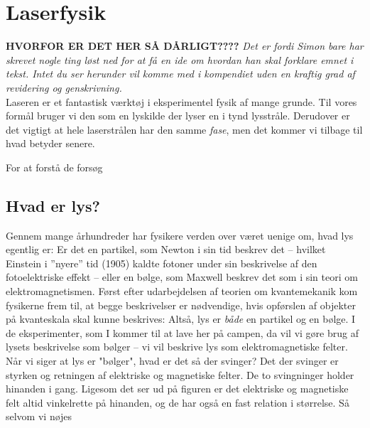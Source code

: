 \documentclass[crop=false, class=memoir]{standalone}
\begin{document}
\chapter{Laserfysik} \label{chap:laser}

\textbf{HVORFOR ER DET HER SÅ DÅRLIGT????} \textit{Det er fordi Simon bare har skrevet nogle ting løst ned for at få en ide om hvordan han skal forklare emnet i tekst. Intet du ser herunder vil komme med i kompendiet uden en kraftig grad af revidering og genskrivning.}\\

Laseren er et fantastisk værktøj i eksperimentel fysik af mange grunde. Til vores formål bruger vi den som en lyskilde der lyser en i tynd lysstråle.  Derudover er det vigtigt at hele laserstrålen har den samme \textit{fase}, men det kommer vi tilbage til hvad betyder senere.

For at forstå de forsøg 


\section{Hvad er lys?}

Gennem mange århundreder har fysikere verden over været uenige om, hvad lys egentlig er: Er det en partikel, som Newton i sin tid beskrev det -- hvilket Einstein i ''nyere'' tid (1905) kaldte fotoner under sin beskrivelse af den fotoelektriske effekt -- eller en bølge, som Maxwell beskrev det som i sin teori om elektromagnetismen. Først efter udarbejdelsen af teorien om kvantemekanik kom fysikerne frem til, at begge beskrivelser er nødvendige, hvis opførslen af objekter på kvanteskala skal kunne beskrives: Altså, lys er \textit{både} en partikel og en bølge. I de eksperimenter, som I kommer til at lave her på campen, da vil vi gøre brug af lysets beskrivelse som bølger -- vi vil beskrive lys som elektromagnetiske felter.\\

Når vi siger at lys er "bølger", hvad er det så der svinger? Det der svinger er styrken og retningen af elektriske og magnetiske felter. De to svingninger holder hinanden i gang. Ligesom det ser ud på figuren er det elektriske og magnetiske felt altid vinkelrette på hinanden, og de har også en fast relation i størrelse. Så selvom vi nøjes 
\end{document}
